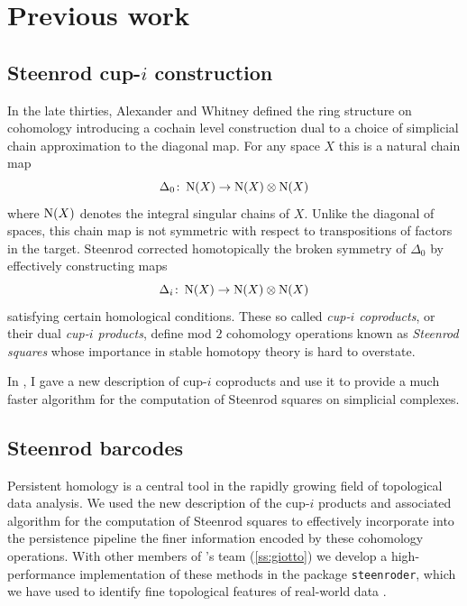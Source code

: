 
\section{Previous work} \label{s:past}

\subsection{Steenrod cup-$i$ construction} \label{ss:cup-i}

In the late thirties, Alexander and Whitney defined the ring structure on cohomology introducing a cochain level construction dual to a choice of simplicial chain approximation to the diagonal map.
For any space $X$ this is a natural chain map
\[
\Delta_0 \colon \operatorname{N}(X) \to \operatorname{N}(X) \otimes \operatorname{N}(X)
\]
where $\operatorname{N}(X)$ denotes the integral singular chains of $X$.
Unlike the diagonal of spaces, this chain map is not symmetric with respect to transpositions of factors in the target.
Steenrod \cite{steenrod1947products} corrected homotopically the broken symmetry of $\Delta_0$ by effectively constructing maps
\begin{equation*}
\Delta_i \colon \operatorname{N}(X) \to \operatorname{N}(X) \otimes \operatorname{N}(X)
\end{equation*}
satisfying certain homological conditions.
These so called \textit{cup-$i$ coproducts}, or their dual \textit{cup-$i$ products}, define mod $2$ cohomology operations known as \textit{Steenrod squares} whose importance in stable homotopy theory is hard to overstate.

In \cite{medina2021newformulas}, I gave a new description of cup-$i$ coproducts and use it to provide a much faster algorithm for the computation of Steenrod squares on simplicial complexes.

\subsection{Steenrod barcodes}

Persistent homology is a central tool in the rapidly growing field of topological data analysis.
We used the new description of the cup-$i$ products and associated algorithm for the computation of Steenrod squares to effectively incorporate into the persistence pipeline the finer information encoded by these cohomology operations.
With other members of 's team (\cref{ss:giotto}) we develop a high-performance implementation of these methods in the package \texttt{steenroder}, which we have used to identify fine topological features of real-world data \cite{medina2018persistence}.

